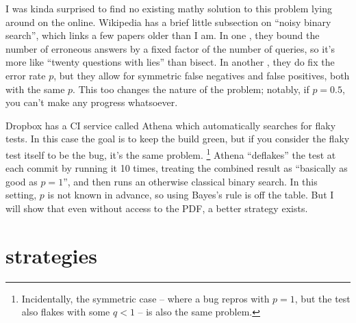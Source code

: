 \documentclass[11pt]{sigplanconf}
\begin{document}
I was kinda surprised to find no existing mathy solution to this problem lying around on the online.
Wikipedia has a brief little subsection on ``noisy binary search'', which links a few papers older than I am.
In one \cite{noisy2}, they bound the number of erroneous answers by a fixed factor of the number of queries,
so it's more like ``twenty questions with lies'' than bisect.
In another \cite{noisy1}, they do fix the error rate $p$,
but they allow for symmetric false negatives and false positives, both with the same $p$.
This too changes the nature of the problem;
notably, if $p=0.5$, you can't make any progress whatsoever.

Dropbox has a CI service called Athena \cite{athena}
which automatically searches for flaky tests. %
In this case the goal is to keep the build green,
but if you consider the flaky test itself to be the bug, it's the same problem.%
\footnote{Incidentally, the symmetric case
-- where a bug repros with $p=1$, but the test also flakes with some $q<1$ --
is also the same problem.}
Athena ``deflakes'' the test at each commit by running it 10 times,
treating the combined result as ``basically as good as $p=1$'',
and then runs an otherwise classical binary search.
In this setting, $p$ is not known in advance, so using Bayes's rule is off the table.
But I will show that even without access to the PDF, a better strategy exists. %


\section{strategies}
\label{sec:strats}
\end{document}
